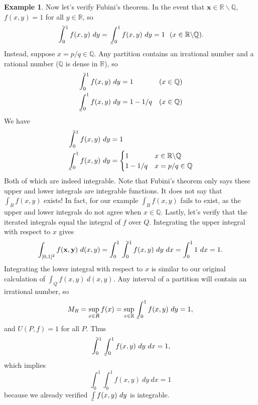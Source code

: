 \documentclass{article}
\def\upint{\mathchoice%
	{\mkern13mu\overline{\vphantom{\intop}\mkern7mu}\mkern-20mu}%
	{\mkern7mu\overline{\vphantom{\intop}\mkern7mu}\mkern-14mu}%
	{\mkern7mu\overline{\vphantom{\intop}\mkern7mu}\mkern-14mu}%
	{\mkern7mu\overline{\vphantom{\intop}\mkern7mu}\mkern-14mu}%
	\int}
\def\lowint{\mkern3mu\underline{\vphantom{\intop}\mkern7mu}\mkern-10mu\int}
\newcommand{\R}{\mathbb{R}}
\newcommand{\Q}{\mathbb{Q}}
\newcommand{\x}{\mathbf{x}}
\newcommand{\y}{\mathbf{y}}
\theoremstyle{definition}
\newtheorem{example}{Example}[section]
\begin{document}
\begin{example}
 	Now let's verify Fubini's theorem. In the event that $ \x \in \R\backslash \Q $, $ f(x,y) = 1 $ for all $ y\in \R $, so 
 	$$ \upint_0^1 f(x,y)\ dy = \lowint_0^1 f(x,y)\ dy  = 1 \ \ (x\in\R\backslash \Q) .$$ 
 	Instead, suppose $ x =p/q\in \Q $. Any partition contains an irrational number and a rational number ($ \Q $ is dense in $ \R $), so 
 	\begin{align*}
 		\upint_0^1 f(x,y)\ dy &= 1 &  (x\in \Q)\\ 
 		\lowint_0^1 f(x,y)\ dy &= 1-1/q &  (x\in \Q)
 	\end{align*}
 	We have 
 	\begin{align*}
 		\upint_0^1 f(x,y)\ dy &= 1 \\
 		\lowint_{0}^1 f(x,y)\ dy & = \begin{cases}
 			1 & x\in \R\backslash\Q\\
 			1-1/q & x=p/q\in \Q
 		\end{cases}
 	\end{align*}
 	Both of which are indeed integrable. Note that Fubini's theorem only says these upper and lower integrals are integrable functions. It does not say that $ \int_Bf(x,y) $ exists! In fact, for our example $\int_Bf(x,y) $ fails to exist, as the upper and lower integrals do not agree when $ x\in \Q $. Lastly, let's verify that the iterated integrals equal the integral of $ f $ over $ Q $. Integrating the upper integral with respect to $ x $ gives
 	$$\int_{[0,1]^2}f(\x,\y)\ d(x,y)=\int_{0}^1\upint_0^1f(x,y)\ dy\ dx =\int_{0}^{1}1\ dx = 1 .$$
 	Integrating the lower integral with respect to $ x $ is similar to our original calculation of $ \int_Q f(x,y)\ d(x,y) $. Any interval of a partition will contain an irrational number, so 
 	$$ M_R = \sup_{x\in R} f(x) = \sup_{x\in \R} \lowint_{0}^1 f(x,y)\ dy = 1,$$ and $ U(P,f) = 1 $ for all $ P $. Thus 
 	$$ \upint_{0}^{1}\lowint_{0}^{1} f(x,y)\ dy \ dx = 1,$$ which implies 
 	$$\int_{0}^{1}\int_{0}^{1} f(x,y)\ dy \ dx = 1 $$ because we already verified $  \lowint f(x,y)\ dy$ is integrable. 
 \end{example}
\end{document}
